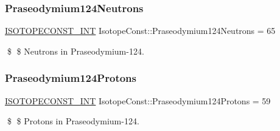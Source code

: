 \subsubsection{\texorpdfstring{Praseodymium124\+Neutrons}{Praseodymium124Neutrons}}
{\footnotesize\ttfamily \mbox{\hyperlink{group___isotope_const-_macros_ga5f18360b3e99483a35c32d789e62621c}{I\+S\+O\+T\+O\+P\+E\+C\+O\+N\+S\+T\+\_\+\+I\+NT}} Isotope\+Const\+::\+Praseodymium124\+Neutrons = 65}

\$ \$ Neutrons in Praseodymium-\/124. \mbox{\label{group___isotope_const-_praseodymium-_pr124_gafff3e7fabfe3f90d0447b74926d7f450}} 
\subsubsection{\texorpdfstring{Praseodymium124\+Protons}{Praseodymium124Protons}}
{\footnotesize\ttfamily \mbox{\hyperlink{group___isotope_const-_macros_ga5f18360b3e99483a35c32d789e62621c}{I\+S\+O\+T\+O\+P\+E\+C\+O\+N\+S\+T\+\_\+\+I\+NT}} Isotope\+Const\+::\+Praseodymium124\+Protons = 59}

\$ \$ Protons in Praseodymium-\/124. 